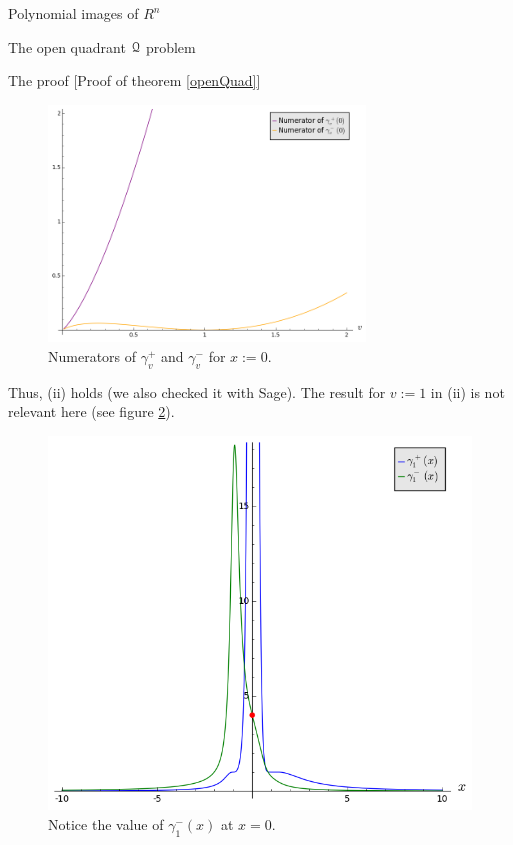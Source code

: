 \documentclass[11pt, a4paper, english, twoside, notitlepage, openright]{report}
\begin{document}
\begin{chapter}{Polynomial images of $R^n$}
\begin{section}{The open quadrant $\mathcal{Q}$ problem}
\begin{subsection}{The proof} [Proof of theorem \ref{openQuad}]
\begin{figure}[h]
\centering
\includegraphics[width=0.75\textwidth]{plots/ch1_08_numerators.png}
\caption{Numerators of $\gamma_v^+$ and $\gamma_v^-$ for $x:=0$.\label{fig:numerators}}
\end{figure}
			
Thus, (ii) holds (we also checked it with Sage). The result for $v:=1$ in (ii) is not relevant here (see figure \ref{fig:limit}).
\begin{figure}[h]
\centering
\includegraphics[width=1\textwidth]{plots/ch1_09_limit.png}
\caption{Notice the value of $\gamma_1^-(x)$ at $x=0$.\label{fig:limit}}
\end{figure}


\end{subsection}
\end{section}
\end{chapter}
\end{document}
